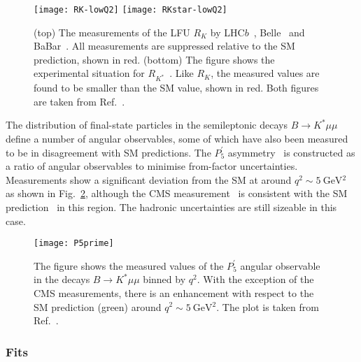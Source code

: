 \begin{figure}
  \centering
  \texttt{[image: RK-lowQ2]}
  \texttt{[image: RKstar-lowQ2]}
  \caption{(top) The measurements of the LFU $R_{K}$ by
    LHC$b$~\cite{Aaij:2019wad}, Belle~\cite{Abdesselam:2019lab} and
    BaBar~\cite{Lees:2012tva}. All measurements are suppressed relative to the
    SM prediction, shown in red. (bottom) The figure shows the experimental
    situation for $R_{K^{*}}$~\cite{Lees:2012tva, Abdesselam:2019wac,
      Aaij:2017vbb}. Like $R_{K}$, the measured values are found to be smaller
    than the SM value, shown in red. Both figures are taken from
    Ref.~\cite{Koppenburg:2016rji}.}
  \label{fig:rkrkstar-summary}
\end{figure}

The distribution of final-state particles in the semileptonic decays
$B \to K^{*} \mu \mu$ define a number of angular observables, some of which have
also been measured to be in disagreement with SM predictions. The
$P_{5}^{\prime}$ asymmetry~\cite{Ali:1991is, Egede:2008uy,
  Descotes-Genon:2013vna} is constructed as a ratio of angular observables to
minimise from-factor uncertainties. Measurements show a significant deviation
from the SM at around $q^{2} \sim \SI{5}{\GeV^{2}}$~\cite{Aaij:2013qta,
  Aaij:2020nrf, Wehle:2016yoi, Aaboud:2018krd} as shown in
Fig.~\ref{fig:p5p-exp}, although the CMS measurement~\cite{Sirunyan:2017dhj} is
consistent with the SM prediction~\cite{Straub:2015ica, Altmannshofer:2014rta,
  Descotes-Genon:2014uoa, Khodjamirian:2010vf} in this region. The hadronic
uncertainties are still sizeable in this case.

\begin{figure}[t]
  \centering
  \texttt{[image: P5prime]}
  \caption{The figure shows the measured values of the $P_{5}^{\prime}$ angular
    observable in the decays $B \to K^{*} \mu\mu$ binned by $q^{2}$. With the
    exception of the CMS measurements, there is an enhancement with respect to
    the SM prediction (green) around $q^{2} \sim \SI{5}{\GeV^{2}}$. The plot is
    taken from Ref.~\cite{Koppenburg:2016rji}.}
  \label{fig:p5p-exp}
\end{figure}

\subsubsection{Fits}

